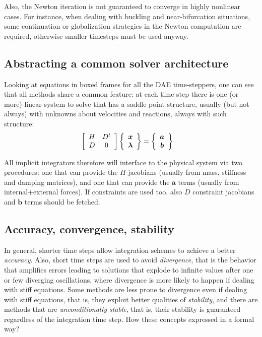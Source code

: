 \documentclass{digitaldynamics}
\def\vect#1{\bm{#1}}
\def\matr#1{{#1}}
\begin{document}
Also, the Newton iteration is not guaranteed to converge in highly nonlinear cases.
For instance, when dealing with buckling and near-bifurcation situations, some
continuation or globalization strategies in the Newton computation are required, otherwise
smaller timesteps must be used anyway.




\subsection{Abstracting a common solver architecture}

Looking at equations in boxed frames for all the DAE time-steppers, one can see that all methods share a common feature: at each time step there is one (or more) linear system to solve that has a saddle-point structure, usually (but not always) with unknowns about velocities and reactions, always with such structure:
%
\begin{align}
\left[
\begin{array}[pos]{cc}
\matr{H}  & \matr{D}^t \\ 
\matr{D} & 0
\end{array}
\right] 
&
\left\{
\begin{array}[pos]{c}
\vect{x} \\
\vect{\lambda}
\end{array}
\right\}
 = 
 \left\{
\begin{array}[pos]{c}
\vect{a} \\
\vect{b}
\end{array}
\right\} &
\label{eq:structure}
\end{align}

All implicit integrators therefore will interface to the physical system via two procedures: one that can provide the $\matr{H}$ jacobians (usually from mass, stiffness and damping matrices), and one that can provide the $\vect{a}$ terms (usually from internal+external forces). If constraints are used too, also $\matr{D}$ constraint jacobians and $\vect{b}$ terms should be fetched.


\subsection{Accuracy, convergence, stability}

In general, shorter time steps allow integration schemes to achieve a better \textit{accuracy}. Also, short time steps are
used to avoid \textit{divergence}, that is the behavior that amplifies errors leading to solutions that explode to infinite values after one or 
few diverging oscillations, where divergence is more likely to happen if dealing with stiff equations. Some methods are less prone 
to divergence even if dealing with stiff equations, that is, they exploit better qualities of \textit{stability}, and 
there are methods that are \textit{unconditionally stable}, that is, their stability is guaranteed regardless of the integration time step. 
How these concepts expressed in a formal way?
\end{document}
